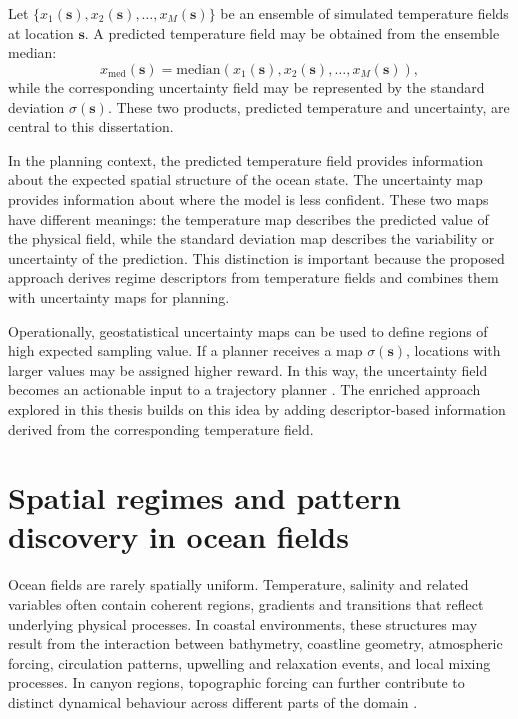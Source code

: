 Let $\{x_1(\mathbf{s}), x_2(\mathbf{s}), \dots, x_M(\mathbf{s})\}$ be an ensemble of simulated temperature fields at location $\mathbf{s}$. A predicted temperature field may be obtained from the ensemble median:
\begin{equation}
    \hat{x}_{\mathrm{med}}(\mathbf{s}) =
    \mathrm{median}\left(x_1(\mathbf{s}), x_2(\mathbf{s}), \dots, x_M(\mathbf{s})\right),
\end{equation}
while the corresponding uncertainty field may be represented by the standard deviation $\sigma(\mathbf{s})$. These two products, predicted temperature and uncertainty, are central to this dissertation.

In the planning context, the predicted temperature field provides information about the expected spatial structure of the ocean state. The uncertainty map provides information about where the model is less confident. These two maps have different meanings: the temperature map describes the predicted value of the physical field, while the standard deviation map describes the variability or uncertainty of the prediction. This distinction is important because the proposed approach derives regime descriptors from temperature fields and combines them with uncertainty maps for planning.

Operationally, geostatistical uncertainty maps can be used to define regions of high expected sampling value. If a planner receives a map $\sigma(\mathbf{s})$, locations with larger values may be assigned higher reward. In this way, the uncertainty field becomes an actionable input to a trajectory planner \cite{bernacchi2025closingloop,duarte2025geostatistical,eidsvik2015value}. The enriched approach explored in this thesis builds on this idea by adding descriptor-based information derived from the corresponding temperature field.

\section{Spatial regimes and pattern discovery in ocean fields} \label{sec:spatial_regimes}

Ocean fields are rarely spatially uniform. Temperature, salinity and related variables often contain coherent regions, gradients and transitions that reflect underlying physical processes. In coastal environments, these structures may result from the interaction between bathymetry, coastline geometry, atmospheric forcing, circulation patterns, upwelling and relaxation events, and local mixing processes. In canyon regions, topographic forcing can further contribute to distinct dynamical behaviour across different parts of the domain \cite{mendes2025oceanmodeldriven}.

